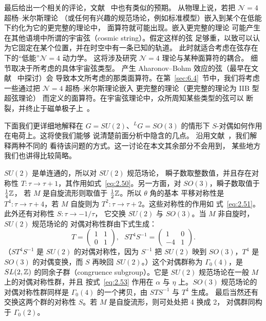 最后给出一个相关的评论，文献~\cite{ref14} 中也有类似的预期。
从物理上说，若把 ${\mathcal N}=4$ 超杨–米尔斯理论
（或任何有兴趣的规范场论，例如标准模型）嵌入到某个在低能下约化为它的更完整的理论中，
面算符就可能出现。嵌入更完整的理论
可能产生在其他语境中所谓的宇宙弦（cosmic string）。假定这样的弦
足够重，以致可以认为它固定在某个位置，并在时空中有一条已知的轨道。
此时就适合考虑在弦存在下的“低能”${\mathcal N}=4$ 动力学。
这将涉及研究 ${\mathcal N}=4$ 理论与某种面算符的耦合。
细节取决于所考虑的具体宇宙弦类型。
产生 Aharonov–Bohm 效应的弦（最早在文献~\cite{ref10} 中探讨）会
导致本文所考虑的那类面算符。在第~\ref{sec:6.4}~节中，我们将考虑一些通过把 ${\mathcal N}=4$ 超杨–米尔斯理论嵌入
更完整的理论（更完整的理论为 IIB 型超弦理论）
而定义的面算符。在宇宙弦理论中，众所周知某些类型的弦可以
断裂，并终止于磁单极子上~\cite{ref47}。


\bigskip{}

下面我们更详细地解释在
$G=SU(2)$、$^LG=SO(3)$ 的情形下 $S$-对偶如何作用在电荷上。这将使我们能够
说清楚前面分析中隐含的几点。
沿用文献~\cite{ref48}，我们解释两种不同的
看待该问题的方式。这一讨论在本文其余部分不会用到，
某些地方我们也讲得比较简略。

$SU(2)$ 是单连通的，所以对 $SU(2)$ 规范场论，
瞬子数取整数值，并且存在对称性
$T:\tau\to\tau+1$，其作用如式~\eqref{eq:2.50}。另一方面，对
$SO(3)$，瞬子数取值于 ${1\over 4}\mathbb{Z}$，
若 $M$ 是自旋流形则取值于 ${1\over 2}\mathbb{Z}$。所以 $\theta$ 角的基本
平移对称性是 $T^4:\tau\to\tau+4$，若 $M$ 自旋则为
$T^2:\tau\to\tau+2$。这些对称性的作用如
式~\eqref{eq:2.51}。此外还有对称性 $S:\tau\to -1/\tau$，
它交换 $SU(2)$ 与 $SO(3)$。当 $M$ 非自旋时，$SU(2)$ 规范场论的
对偶对称性群由下式生成：
\setcounter{equation}{53}
\begin{equation}\label{eq:2.54}
  T=\left(\begin{matrix}1&1\\ 0&1\end{matrix}\right),
~~~ST^4S^{-1}=\left(\begin{matrix}1&0\\-4&1\end{matrix}\right).
\end{equation}
（$ST^4S^{-1}$
是 $SU(2)$ 的对偶对称性，因为 $S^{-1}$ 把 $SU(2)$ 映到
$SO(3)$，$T^4$ 是 $SO(3)$ 的对偶变换，而 $S$
再映回 $SU(2)$。）这个对偶群称为
$\Gamma_0(4)$，是 $SL(2,{\mathbb{Z}})$ 的同余子群（congruence subgroup）。它是
$SU(2)$ 规范场论在一般 $M$ 上的对偶对称性群，并且
按式~\eqref{eq:2.53} 作用在 $\alpha$ 与 $\eta$ 上。$SO(3)$ 规范场论的
对偶对称性群同样是 $\Gamma_0(4)$ 的一个拷贝，由 $STS^{-1}$ 与 $T^4$ 生成。
最后当然还有交换这两个群的对称性 $S$。若 $M$ 是自旋流形，则可处处把 4 换成 2，
对偶群同构于 $\Gamma_0(2)$。

